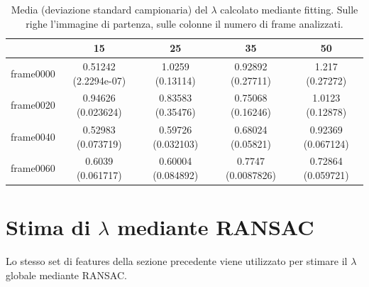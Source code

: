 \documentclass[12pt]{report}
\begin{document}
\begin{table}[H]
\begin{center}
\begin{tabular}{|c|c|c|c|c|}
	\hline
	& 15 & 25 & 35 & 50 \\
	\hline
	frame0000 & 0.51242 (2.2294e-07) & 1.0259 (0.13114) & 0.92892 (0.27711) & 1.217 (0.27272)\\
	\hline
	frame0020 & 0.94626 (0.023624) & 0.83583 (0.35476) & 0.75068 (0.16246) & 1.0123 (0.12878)\\
	\hline
	frame0040 & 0.52983 (0.073719) & 0.59726 (0.032103) & 0.68024 (0.05821) & 0.92369 (0.067124)\\
	\hline
	frame0060 & 0.6039 (0.061717) & 0.60004 (0.084892) & 0.7747 (0.0087826) & 0.72864 (0.059721)\\
	\hline
\end{tabular}
\caption{Media (deviazione standard campionaria) del $\lambda$ calcolato mediante fitting. Sulle righe l'immagine di partenza, sulle colonne il numero di frame analizzati.}
\label{tabFit}
\end{center}
\end{table}


\newpage
\section{Stima di $\lambda$ mediante RANSAC}

\noindent Lo stesso set di features della sezione precedente viene utilizzato per stimare il $\lambda$ globale mediante RANSAC.
\end{document}
